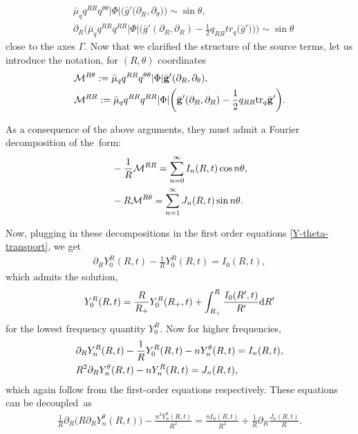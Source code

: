 \documentclass[pdftex]{sigma}
\def\ptl{\partial}%
\def\cal#1{\mathcal{#1}}%
\def\halb{\frac{1}{2}}%
\newcommand{\bgg}{{\bar{\bf g}}}
\numberwithin{equation}{section}
\begin{document}
\begin{align*}
& \bar{\mu}_q q^{RR} q^{\theta \theta} \vert \Phi \vert \bigl(\bar{g}' \bigl(\ptl_R, \ptl_\theta\bigr)\bigr)\sim \sin \theta ,\\
&\ptl_R \biggl(\bar{\mu}_q q^{RR} q^{RR} \vert \Phi \vert \biggl(\bar{g}' (\ptl_R, \ptl_R) - \halb q_{RR} tr_q \bigl(\bar{g}'\bigr)\biggr)\biggr) \sim \sin \theta
\end{align*}
close to the axes $\Gamma$. Now that we clarified the structure of the source terms, let us introduce the notation, for $(R, \theta)$ coordinates
\begin{align*}
&\cal{M}^{ R \theta }:= \bar{\mu}_q q^{RR} q^{\theta \theta} \vert \Phi \vert \bgg'(\ptl_R, \ptl_\theta), \notag\\
&\cal{M}^{R R}:= \bar{\mu}_q q^{R R} q^{RR} \vert \Phi \vert \biggl(\bgg' (\ptl_R, \ptl_R) - \halb q_{RR} {\rm tr}_q \bgg'\biggr).
\end{align*}

 As a consequence of the above arguments, they must admit a Fourier decomposition of the~form:
\begin{align*}
&- \frac{1}{R} \mathcal{M}^{RR}= \sum^\infty_{n = 0} I_n (R, t) \cos n \theta , \notag\\
&-R \mathcal{M}^{R \theta}= \sum^\infty_{n=1} J_n (R, t) \sin n \theta.
\end{align*}

Now, plugging in these decompositions in the first order equations \eqref{Y-theta-transport}, we
get
\begin{align*}
\ptl_R Y^R_0 (R, t) - \frac{1}{R} Y^R_0 (R, t) = I_0 (R, t),
\end{align*}
which admits the solution,
\begin{align*}
Y^R_0 (R, t) = \frac{R}{R_+} Y_0^R (R_+, t) + \int^R_{R_+} \frac{I_0 (R', t)}{R'} {\rm d}R'
\end{align*}
for the lowest frequency quantity $Y^R_0$. Now for higher frequencies,
\begin{align*}
&\ptl_R Y_n^R (R, t) - \frac{1}{R} Y^R_0 (R, t) - n Y^\theta_n (R, t)= I_n (R, t), \notag\\
& R^2 \ptl_R Y^\theta _n (R, t) - n Y^R_n (R, t) = J_n (R, t),
\end{align*}
which again follow from the first-order equations respectively. These equations can be decoupled~as
\begin{align} \label{Y-first-order-modes}
\frac{1}{R} \ptl_R \bigl(R \ptl_R Y^\theta_n (R, t)\bigr) - \frac{n^2 Y^\theta_n(R, t)}{R^2} = \frac{n I_n (R, t)}{R^2} + \frac{1}{R}
\ptl_R \frac{J_n (R, t)}{R}.
\end{align}
\end{document}
